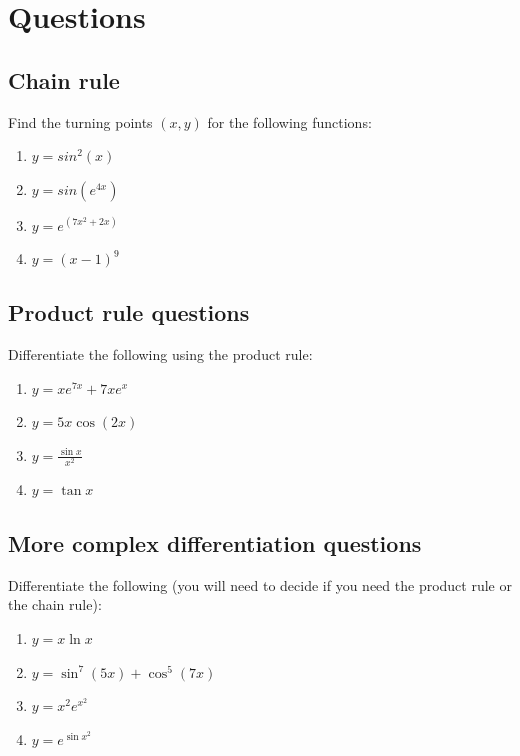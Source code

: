 \documentclass[
]{book}
\providecommand{\tightlist}{%
  \setlength{\itemsep}{0pt}\setlength{\parskip}{0pt}}
\begin{document}
\hypertarget{sec:Questions5}{%
\section{Questions}\label{sec:Questions5}}

\hypertarget{chain-rule}{%
\subsection{Chain rule}\label{chain-rule}}

Find the turning points \((x,y)\) for the following functions:

\begin{enumerate}
\def\labelenumi{\arabic{enumi}.}
\tightlist
\item
  \(y = sin^2(x)\)
\item
  \(y = sin(e^{4x})\)
\item
  \(y = e^{(7x^2 + 2x)}\)
\item
  \(y = (x-1)^9\)
\end{enumerate}

\hypertarget{product-rule-questions}{%
\subsection{Product rule questions}\label{product-rule-questions}}

Differentiate the following using the product rule:

\begin{enumerate}
\def\labelenumi{\arabic{enumi}.}
\tightlist
\item
  \(y = x e^{7x}+ 7xe^x\)
\item
  \(y = 5x \cos (2x)\)
\item
  \(y = \frac{\sin x}{x^2}\)
\item
  \(y = \tan x\)
\end{enumerate}

\hypertarget{more-complex-differentiation-questions}{%
\subsection{More complex differentiation questions}\label{more-complex-differentiation-questions}}

Differentiate the following (you will need to decide if you need the product rule or the chain rule):

\begin{enumerate}
\def\labelenumi{\arabic{enumi}.}
\tightlist
\item
  \(y = x \ln x\)
\item
  \(y = \sin ^7 (5x)+ \cos ^5 (7x)\)
\item
  \(y = x^2 e^{x^2}\)
\item
  \(y = e^{\sin x^2}\)
\end{enumerate}
\end{document}
